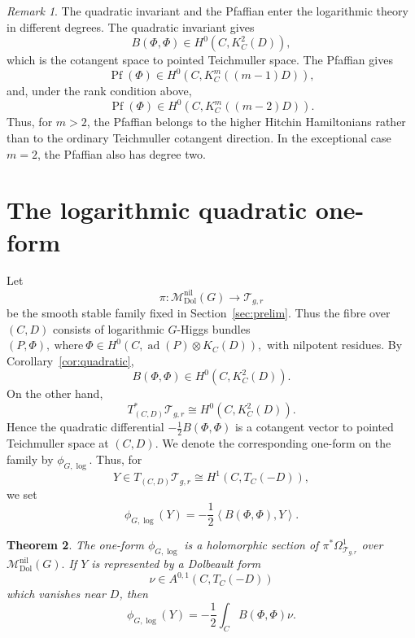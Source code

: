 \documentclass[11pt,reqno]{amsart}
\numberwithin{equation}{section}
\theoremstyle{plain}
\newtheorem{theorem}{Theorem}[section]
\theoremstyle{definition}
\theoremstyle{remark}
\newtheorem{remark}[theorem]{Remark}
\begin{document}
\begin{remark}
The quadratic invariant and the Pfaffian enter the logarithmic theory in
different degrees. The quadratic invariant gives
\[
        B(\Phi,\Phi)\in H^0(C,K_C^2(D)),
\]
which is the cotangent space to pointed Teichmuller space. The Pfaffian gives
\[
        \operatorname{Pf}(\Phi)\in H^0(C,K_C^m((m-1)D)),
\]
and, under the rank condition above,
\[
        \operatorname{Pf}(\Phi)\in H^0(C,K_C^m((m-2)D)).
\]
Thus, for \(m>2\), the Pfaffian belongs to the higher Hitchin Hamiltonians
rather than to the ordinary Teichmuller cotangent direction.  In the exceptional
case \(m=2\), the Pfaffian also has degree two.
\end{remark}

\section{The logarithmic quadratic one-form}
\label{sec:logoneform}

Let
\[
        \pi:\mathcal M^{\mathrm{nil}}_{\mathrm{Dol}}(G)
        \longrightarrow
        \mathcal T_{g,r}
\]
be the smooth stable family fixed in Section~\ref{sec:prelim}. Thus the fibre
over \((C,D)\) consists of logarithmic \(G\)-Higgs bundles
\(
        (P,\Phi),
        \ \text{where} \
        \Phi\in H^0(C,\operatorname{ad}(P)\otimes K_C(D)),
\)
with nilpotent residues. By Corollary~\ref{cor:quadratic},
\[
        B(\Phi,\Phi)\in H^0(C,K_C^2(D)).
\]
On the other hand,
\[
        T^*_{(C,D)}\mathcal T_{g,r}
        \cong
        H^0(C,K_C^2(D)).
\]
Hence the quadratic differential
\(
        -\frac12B(\Phi,\Phi)
\)
is a cotangent vector to pointed Teichmuller space at \((C,D)\).  We denote the
corresponding one-form on the family by
\(
        \phi_{G,\log}.
\)
Thus, for
\[
        Y\in T_{(C,D)}\mathcal T_{g,r}
        \cong H^1(C,T_C(-D)),
\]
we set
\[
        \phi_{G,\log}(Y)
        =
        -\frac12
        \left\langle B(\Phi,\Phi),Y\right\rangle .
\]

\begin{theorem}
\label{thm:log-oneform}
The one-form
\(
        \phi_{G,\log}
\)
is a holomorphic section of
\(
        \pi^*\Omega^1_{\mathcal T_{g,r}}
\)
over
\(
        \mathcal M^{\mathrm{nil}}_{\mathrm{Dol}}(G).
\)
If \(Y\) is represented by a Dolbeault form
\[
        \nu\in A^{0,1}(C,T_C(-D))
\]
which vanishes near \(D\), then
\[
        \phi_{G,\log}(Y)
        =
        -\frac12\int_C B(\Phi,\Phi)\nu .
\]
\end{theorem}
\end{document}
